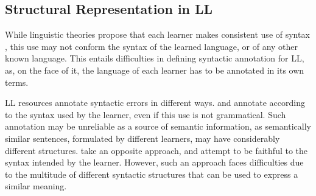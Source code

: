\documentclass[letterpaper, 11pt]{article}
\begin{document}
%
%
%
\subsection{Structural Representation in LL}
%
While linguistic theories propose that each learner makes consistent use of syntax \cite{huebner1985system,tarone1983variability}, this use may not conform the syntax of the learned language, or of any other known language. This entails difficulties in defining syntactic annotation for LL, as, on the face of it, the language of each learner has to be annotated in its own terms.

LL resources annotate syntactic errors in different ways.
 and 
annotate according to the syntax used
by the learner, even if this use is not grammatical.
Such annotation may be unreliable as a source of semantic information, as semantically similar sentences, formulated by different learners, may have considerably different structures.  take an opposite approach, and attempt
to be faithful to the syntax intended by the learner. However, such an approach faces difficulties due to the multitude of different syntactic structures that can be used to express a similar meaning.
%
\end{document}
